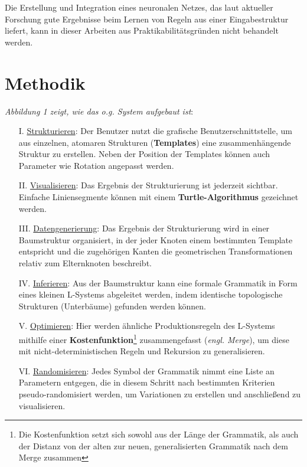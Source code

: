 Die Erstellung und Integration eines neuronalen Netzes, das laut aktueller Forschung gute Ergebnisse beim Lernen von
Regeln aus einer Eingabestruktur liefert, kann in dieser Arbeiten aus Praktikabilitätsgründen nicht behandelt werden.

\section{Methodik}

\textit{Abbildung 1 zeigt, wie das o.g. System aufgebaut ist}:
\begin{itemize}
    \item[I.] \underline{Strukturieren}: Der Benutzer nutzt die grafische Benutzerschnittstelle, um aus
    einzelnen, atomaren Strukturen (\textbf{Templates}) eine zusammenhängende Struktur zu erstellen.
    Neben der Position der Templates können auch Parameter wie Rotation angepasst
    werden.
    \item[II.] \underline{Visualisieren}: Das Ergebnis der Strukturierung ist jederzeit sichtbar.
    Einfache Liniensegmente können mit einem \textbf{Turtle-Algorithmus} gezeichnet werden.
    \item[III.] \underline{Datengenerierung}: Das Ergebnis der Strukturierung wird in einer Baumstruktur
    organisiert, in der jeder Knoten einem bestimmten Template entspricht und die zugehörigen Kanten die
    geometrischen Transformationen relativ zum Elternknoten beschreibt.
    \item[IV.] \underline{Inferieren}: Aus der Baumstruktur kann eine formale Grammatik in Form eines kleinen
    L-Systems abgeleitet werden, indem identische topologische Strukturen (Unterbäume) gefunden werden können.
    \item[V.] \underline{Optimieren}: Hier werden ähnliche Produktionsregeln des L-Systems mithilfe einer
    \textbf{Kostenfunktion}\footnote[1]{Die Kostenfunktion setzt sich sowohl aus der Länge der Grammatik, als
    auch der Distanz von der alten zur neuen, generalisierten Grammatik nach dem Merge zusammen} zusammengefasst
    (\textit{engl. Merge}), um diese mit nicht-deterministischen Regeln und Rekursion zu generalisieren.
    \item[VI.] \underline{Randomisieren}: Jedes Symbol der Grammatik nimmt eine Liste an Parametern entgegen, die
    in diesem Schritt nach bestimmten Kriterien pseudo-randomisiert werden, um Variationen zu erstellen und
    anschließend zu visualisieren.
\end{itemize}

